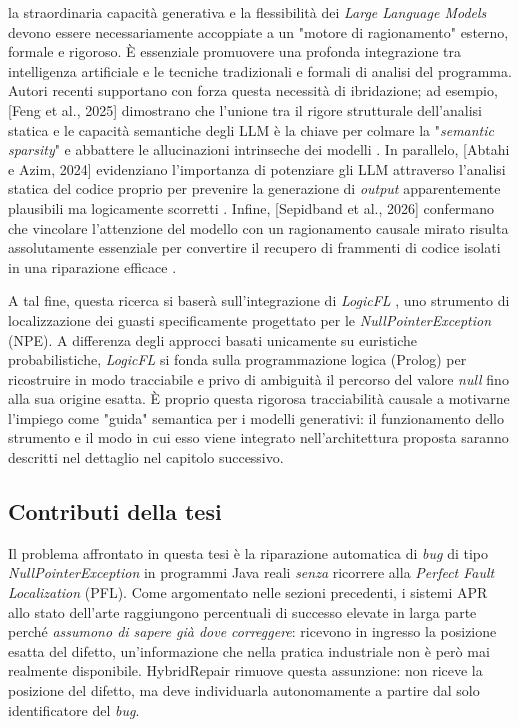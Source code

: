 la straordinaria capacità generativa e la flessibilità dei \textit{Large Language Models} devono essere necessariamente accoppiate 
a un "motore di ragionamento" esterno, formale e rigoroso. È essenziale promuovere una profonda integrazione 
tra intelligenza artificiale e le tecniche tradizionali e formali di analisi del programma. Autori recenti 
supportano con forza questa necessità di ibridazione; ad esempio, [Feng et al., 2025] dimostrano che l'unione 
tra il rigore strutturale dell'analisi statica e le capacità semantiche degli LLM è la chiave per colmare 
la "\textit{semantic sparsity}" e abbattere le allucinazioni intrinseche dei modelli \cite{feng2025concurrency}. 
In parallelo, [Abtahi e Azim, 2024] evidenziano l'importanza di potenziare gli LLM attraverso l'analisi statica 
del codice proprio per prevenire la generazione di \textit{output} apparentemente plausibili ma logicamente scorretti \cite{abtahi_augmenting}. 
Infine, [Sepidband et al., 2026] confermano che vincolare l'attenzione del modello con un ragionamento causale 
mirato risulta assolutamente essenziale per convertire il recupero di frammenti di codice isolati in una riparazione efficace \cite{sepidband2026rgfl}.

A tal fine, questa ricerca si baserà sull'integrazione di \textit{LogicFL} \cite{kim2024identifying}, uno strumento di
localizzazione dei guasti specificamente progettato per le \textit{NullPointerException} (NPE). A differenza degli
approcci basati unicamente su euristiche probabilistiche, \textit{LogicFL} si fonda sulla programmazione logica (Prolog)
per ricostruire in modo tracciabile e privo di ambiguità il percorso del valore \textit{null} fino alla sua origine esatta.
È proprio questa rigorosa tracciabilità causale a motivarne l'impiego come "guida" semantica per i modelli generativi: il
funzionamento dello strumento e il modo in cui esso viene integrato nell'architettura proposta saranno descritti nel dettaglio
nel capitolo successivo.

\subsection{Contributi della tesi}

Il problema affrontato in questa tesi è la riparazione automatica di \textit{bug} di tipo
\textit{NullPointerException} in programmi Java reali \emph{senza} ricorrere alla
\textit{Perfect Fault Localization} (PFL). Come argomentato nelle sezioni precedenti, i sistemi
APR allo stato dell'arte raggiungono percentuali di successo elevate in larga parte perché
\emph{assumono di sapere già dove correggere}: ricevono in ingresso la posizione esatta del
difetto, un'informazione che nella pratica industriale non è però mai realmente disponibile.
HybridRepair rimuove questa assunzione: non riceve la posizione del difetto, ma deve individuarla
autonomamente a partire dal solo identificatore del \textit{bug}.

